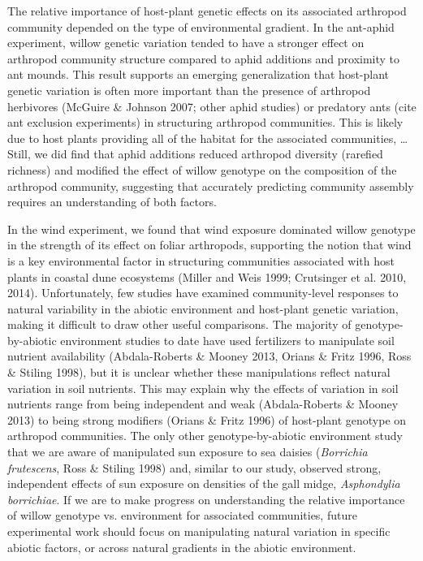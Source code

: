 \documentclass[11pt]{article}
\begin{document}
The relative importance of host-plant genetic effects on its associated arthropod community depended on the type of environmental gradient. In the ant-aphid experiment, willow genetic variation tended to have a stronger effect on arthropod community structure compared to aphid additions and proximity to ant mounds. This result supports an emerging generalization that host-plant genetic variation is often more important than the presence of arthropod herbivores (McGuire \& Johnson 2007; other aphid studies) or predatory ants (cite ant exclusion experiments) in structuring arthropod communities. This is likely due to host plants providing all of the habitat for the associated communities, … Still, we did find that aphid additions reduced arthropod diversity (rarefied richness) and modified the effect of willow genotype on the composition of the arthropod community, suggesting that accurately predicting community assembly requires an understanding of both factors. 

In the wind experiment, we found that wind exposure dominated willow genotype in the strength of its effect on foliar arthropods, supporting the notion that wind is a key environmental factor in structuring communities associated with host plants in coastal dune ecosystems (Miller and Weis 1999; Crutsinger et al. 2010, 2014). Unfortunately, few studies have examined community-level responses to natural variability in the abiotic environment and host-plant genetic variation, making it difficult to draw other useful comparisons. The majority of genotype-by-abiotic environment studies to date have used fertilizers to manipulate soil nutrient availability (Abdala-Roberts \& Mooney 2013, Orians \& Fritz 1996, Ross \& Stiling 1998), but it is unclear whether these manipulations reflect natural variation in soil nutrients. This may explain why the effects of variation in soil nutrients range from being independent and weak (Abdala-Roberts \& Mooney 2013) to being strong modifiers (Orians \& Fritz 1996) of host-plant genotype on arthropod communities. The only other genotype-by-abiotic environment study that we are aware of manipulated sun exposure to sea daisies (\textit{Borrichia frutescens}, Ross \& Stiling 1998) and, similar to our study, observed strong, independent effects of sun exposure on densities of the gall midge, \textit{Asphondylia borrichiae}. If we are to make progress on understanding the relative importance of willow genotype vs. environment for associated communities, future experimental work should focus on manipulating natural variation in specific abiotic factors, or across natural gradients in the abiotic environment. 
% 
% 
\end{document}
